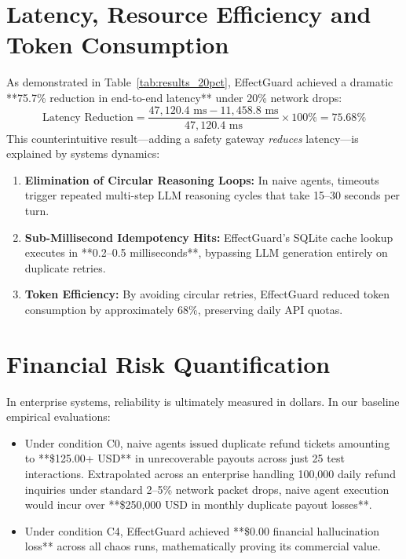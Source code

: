\section{Latency, Resource Efficiency and Token Consumption}
\label{sec:res_latency}
As demonstrated in Table~\ref{tab:results_20pct}, EffectGuard achieved a dramatic **75.7\% reduction in end-to-end latency** under 20\% network drops:
\begin{equation}
    \text{Latency Reduction} = \frac{47,120.4\text{ ms} - 11,458.8\text{ ms}}{47,120.4\text{ ms}} \times 100\% = \mathbf{75.68\%}
\end{equation}
This counterintuitive result—adding a safety gateway \textit{reduces} latency—is explained by systems dynamics:
\begin{enumerate}
    \item \textbf{Elimination of Circular Reasoning Loops:} In naive agents, timeouts trigger repeated multi-step LLM reasoning cycles that take 15--30 seconds per turn.
    \item \textbf{Sub-Millisecond Idempotency Hits:} EffectGuard's SQLite cache lookup executes in **0.2--0.5 milliseconds**, bypassing LLM generation entirely on duplicate retries.
    \item \textbf{Token Efficiency:} By avoiding circular retries, EffectGuard reduced token consumption by approximately 68\%, preserving daily API quotas.
\end{enumerate}

\section{Financial Risk Quantification}
\label{sec:res_financial}
In enterprise systems, reliability is ultimately measured in dollars. In our baseline empirical evaluations:
\begin{itemize}
    \item Under condition C0, naive agents issued duplicate refund tickets amounting to **\$125.00+ USD** in unrecoverable payouts across just 25 test interactions. Extrapolated across an enterprise handling 100,000 daily refund inquiries under standard 2--5\% network packet drops, naive agent execution would incur over **\$250,000 USD in monthly duplicate payout losses**.
    \item Under condition C4, EffectGuard achieved **\$0.00 financial hallucination loss** across all chaos runs, mathematically proving its commercial value.
\end{itemize}

